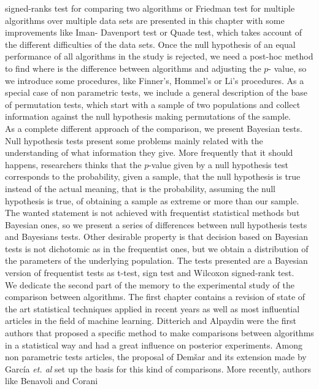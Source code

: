 signed-ranks test for comparing two algorithms or Friedman 
test for multiple algorithms over multiple data sets are 
presented in this chapter with some improvements like Iman-
Davenport test or Quade test, which takes account of the 
different difficulties of the data sets. Once the null 
hypothesis of an equal performance of all algorithms in the 
study is rejected, we need a post-hoc method to find where is 
the difference between algorithms and adjusting the $p$-
value, so we introduce some procedures, like Finner’s, 
Hommel’s or Li’s procedures. As a special case of non 
parametric tests, we include a general description of the 
base of permutation tests, which start with a sample of two 
populations and collect information against the null 
hypothesis making permutations of the sample. \\
	As a complete different approach of the comparison, we 
present Bayesian tests. Null hypothesis tests present some 
problems mainly related with the understanding of what 
information they give. More frequently that it should 
happens, researchers thinks that the $p$-value given by a 
null hypothesis test corresponds to the probability, given a 
sample, that the null hypothesis is true instead of the 
actual meaning, that is the probability, assuming the null 
hypothesis is true, of obtaining a sample as extreme or more 
than our sample. The wanted statement is not achieved with 
frequentist statistical methods but Bayesian ones, so we 
present a series of differences between null hypothesis tests 
and Bayesians tests. Other desirable property is that 
decision based on Bayesian tests is not dichotomic as in the 
frequentist ones, but we obtain a distribution of the 
parameters of the underlying population. The tests presented 
are a Bayesian version of frequentist tests as t-test, sign 
test and Wilcoxon signed-rank test.\\
	We dedicate the second part of the memory to the 
experimental study of the comparison between algorithms. 
The first chapter contains a revision of state of the art 
statistical techniques applied in recent years as well as 
most influential articles in the field of machine learning.  
Ditterich and  Alpaydin were the first authors that proposed 
a specific method to make comparisons between algorithms in a 
statistical way and had a great influence on posterior 
experiments. Among non parametric tests articles, the 
proposal of Dem\v{s}ar and its extension made by García 
\textit{et. al} set up the basis for this kind of 
comparisons. More recently, authors like Benavoli and Corani 
